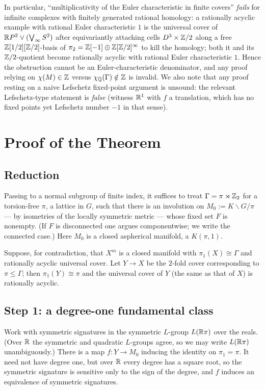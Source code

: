 \documentclass[11pt]{article}
\begin{document}
In particular, ``multiplicativity of the Euler characteristic in finite covers''
\emph{fails} for infinite complexes with finitely generated rational homology: a
rationally acyclic example with rational Euler characteristic $1$ is the
universal cover of $\mathbb{R} P^2\vee(\bigvee_\infty S^2)$ after equivariantly attaching
cells $D^3\times\mathbb{Z}/2$ along a free $\mathbb{Z}[1/2][\mathbb{Z}/2]$-basis of
$\pi_2=\mathbb{Z}[-1]\oplus\mathbb{Z}[\mathbb{Z}/2]^{\infty}$ to kill the homology; both it and its
$\mathbb{Z}/2$-quotient become rationally acyclic with rational Euler characteristic $1$.
Hence the obstruction cannot be an Euler-characteristic denominator, and any
proof relying on $\chi(M)\in\mathbb{Z}$ versus $\chi_{\mathbb{Q}}(\Gamma)\notin\mathbb{Z}$ is invalid. We
also note that any proof resting on a naive Lefschetz fixed-point argument is
unsound: the relevant Lefschetz-type statement is \emph{false} (witness
$\mathbb{R}^1$ with $f$ a translation, which has no fixed points yet Lefschetz number
$-1$ in that sense).

\section*{Proof of the Theorem}

\subsection*{Reduction}

Passing to a normal subgroup of finite index, it suffices to treat
$\Gamma=\pi\rtimes\mathbb{Z}_2$ for a torsion-free $\pi$, a lattice in $G$, such that
there is an involution on $M_0:=K\backslash G/\pi$ --- by isometries of the
locally symmetric metric --- whose fixed set $F$ is nonempty. (If $F$ is
disconnected one argues componentwise; we write the connected case.) Here $M_0$
is a closed aspherical manifold, a $K(\pi,1)$.

Suppose, for contradiction, that $X^m$ is a closed manifold with
$\pi_1(X)\cong\Gamma$ and rationally acyclic universal cover. Let $Y\to X$ be the
$2$-fold cover corresponding to $\pi\le\Gamma$; then $\pi_1(Y)\cong\pi$ and the
universal cover of $Y$ (the same as that of $X$) is rationally acyclic.

\subsection*{Step 1: a degree-one fundamental class}

Work with symmetric signatures in the symmetric $L$-group $L(\mathbb{R}\pi)$ over the
reals. (Over $\mathbb{R}$ the symmetric and quadratic $L$-groups agree, so we may write
$L(\mathbb{R}\pi)$ unambiguously.) There is a map $f:Y\to M_0$ inducing the identity on
$\pi_1=\pi$. It need not have degree one, but over $\mathbb{R}$ every degree has a square
root, so the symmetric signature is sensitive only to the sign of the degree,
and $f$ induces an equivalence of symmetric signatures.
\end{document}
